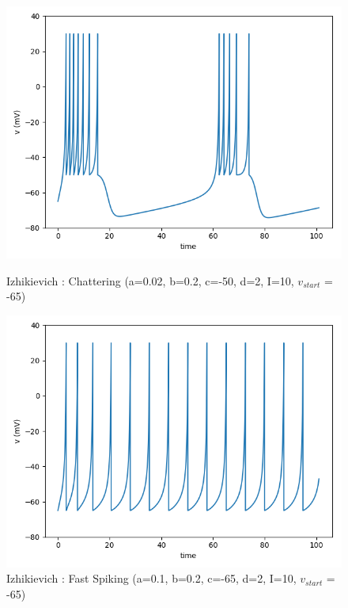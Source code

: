 \documentclass[12pt]{scrartcl}
\begin{document}
\begin{figure}[!h]
\begin{minipage}[l]{.48\linewidth}
\centering
\includegraphics[scale=0.5]{imgs/izC.png}
\caption{Izhikievich : Chattering (a=0.02, b=0.2, c=-50, d=2, I=10, $v_{start}$ = -65)}
\label{izC}
\end{minipage}\hfill
\begin{minipage}[l]{.48\linewidth}
\centering
\includegraphics[scale=0.5]{imgs/izFS.png}
\caption{Izhikievich : Fast Spiking (a=0.1, b=0.2, c=-65, d=2, I=10, $v_{start}$ = -65)}
\label{izFS}
\end{minipage}\hfill
\end{figure}
\end{document}
